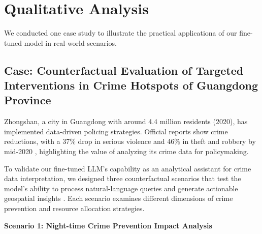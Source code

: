 
\section{Qualitative Analysis}

We conducted one case study to illustrate the practical applicationa of our fine-tuned model in real-world scenarios. 


\subsection{Case: Counterfactual Evaluation of Targeted Interventions in Crime Hotspots of Guangdong Province}

Zhongshan, a city in Guangdong with around 4.4 million residents (2020), has implemented data-driven policing strategies. Official reports show crime reductions, with a 37\% drop in serious violence and 46\% in theft and robbery by mid-2020 \cite{Zhongshan2020}, highlighting the value of analyzing its crime data for policymaking.

To validate our fine-tuned LLM's capability as an analytical assistant for crime data interpretation, we designed three counterfactual scenarios that test the model's ability to process natural-language queries and generate actionable geospatial insights \cite{William2025}. Each scenario examines different dimensions of crime prevention and resource allocation strategies.



\noindent \textbf{Scenario 1: Night-time Crime Prevention Impact Analysis}

